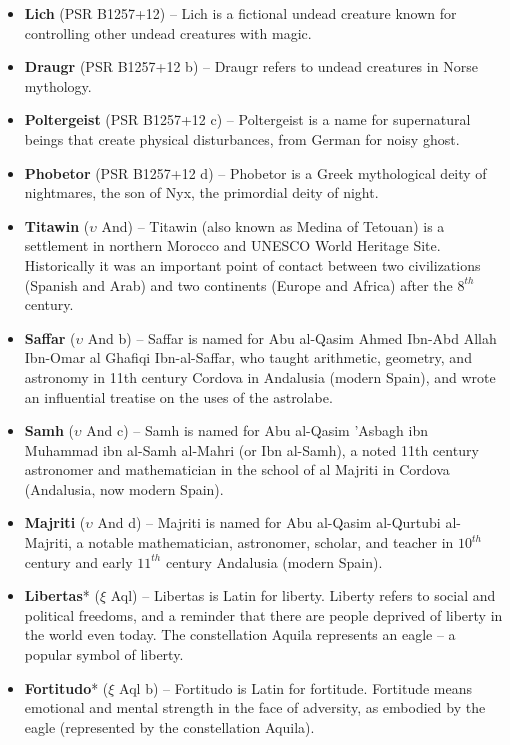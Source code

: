 \begin{itemize}
\item \textbf{Lich} (PSR B1257+12) -- Lich is a fictional undead creature known for controlling other undead creatures with magic.
\item \textbf{Draugr} (PSR B1257+12 b) -- Draugr refers to undead creatures in Norse mythology.
\item \textbf{Poltergeist} (PSR B1257+12 c) -- Poltergeist is a name for supernatural beings that create physical disturbances, from German for noisy ghost.
\item \textbf{Phobetor} (PSR B1257+12 d) -- Phobetor is a Greek mythological deity of nightmares, the son of Nyx, the primordial deity of night.
\item \textbf{Titawin} ($\upsilon$ And) -- Titawin (also known as Medina of Tetouan) is a settlement in northern Morocco and UNESCO World Heritage Site. Historically it was an important point of contact between two civilizations (Spanish and Arab) and two continents (Europe and Africa) after the $8^{th}$ century.
\item \textbf{Saffar} ($\upsilon$ And b) -- Saffar is named for Abu al-Qasim Ahmed Ibn-Abd Allah Ibn-Omar al Ghafiqi Ibn-al-Saffar, who taught arithmetic, geometry, and astronomy in 11th century Cordova in Andalusia (modern Spain), and wrote an influential treatise on the uses of the astrolabe.
\item \textbf{Samh} ($\upsilon$ And c) -- Samh is named for Abu al-Qasim 'Asbagh ibn Muhammad ibn al-Samh al-Mahri (or Ibn al-Samh), a noted 11th century astronomer and mathematician in the school of al Majriti in Cordova (Andalusia, now modern Spain).
\item \textbf{Majriti} ($\upsilon$ And d) -- Majriti is named for Abu al-Qasim al-Qurtubi al-Majriti, a notable mathematician, astronomer, scholar, and teacher in $10^{th}$ century and early $11^{th}$ century Andalusia (modern Spain).
\item \textbf{Libertas}* ($\xi$ Aql) -- Libertas is Latin for liberty. Liberty refers to social and political freedoms, and a reminder that there are people deprived of liberty in the world even today. The constellation Aquila represents an eagle -- a popular symbol of liberty.
\item \textbf{Fortitudo}* ($\xi$ Aql b) -- Fortitudo is Latin for fortitude. Fortitude means emotional and mental strength in the face of adversity, as embodied by the eagle (represented by the constellation Aquila).
\end{itemize}

